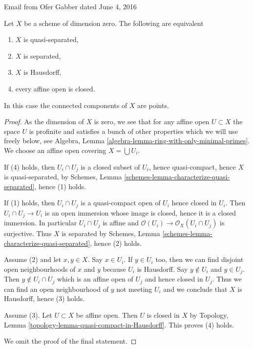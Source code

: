 \begin{lemma}
\label{lemma-dimension-zero}
\begin{reference}
Email from Ofer Gabber dated June 4, 2016
\end{reference}
Let $X$ be a scheme of dimension zero. The following are equivalent
\begin{enumerate}
\item $X$ is quasi-separated,
\item $X$ is separated,
\item $X$ is Hausdorff,
\item every affine open is closed.
\end{enumerate}
In this case the connected components of $X$ are points.
\end{lemma}

\begin{proof}
As the dimension of $X$ is zero, we see that for any affine open
$U \subset X$ the space $U$ is profinite and satisfies
a bunch of other properties which we will use freely below, see
Algebra, Lemma \ref{algebra-lemma-ring-with-only-minimal-primes}.
We choose an affine open covering $X = \bigcup U_i$.

\medskip\noindent
If (4) holds, then $U_i \cap U_j$ is a closed subset of
$U_i$, hence quasi-compact, hence $X$ is quasi-separated,
by Schemes, Lemma \ref{schemes-lemma-characterize-quasi-separated},
hence (1) holds.

\medskip\noindent
If (1) holds, then $U_i \cap U_j$ is a quasi-compact open
of $U_i$ hence closed in $U_i$. Then $U_i \cap U_j \to U_i$
is an open immersion whose image is closed, hence it is a
closed immersion. In particular $U_i \cap U_j$ is affine
and $\mathcal{O}(U_i) \to \mathcal{O}_X(U_i \cap U_j)$ is surjective.
Thus $X$ is separated
by Schemes, Lemma \ref{schemes-lemma-characterize-quasi-separated},
hence (2) holds.

\medskip\noindent
Assume (2) and let $x, y \in X$. Say $x \in U_i$. If $y \in U_i$
too, then we can find disjoint open neighbourhoods of $x$ and $y$
because $U_i$ is Hausdorff. Say $y \not \in U_i$ and $y \in U_j$.
Then $y \not \in U_i \cap U_j$ which is an affine open of $U_j$
and hence closed in $U_j$. Thus we can find an open neighbourhood
of $y$ not meeting $U_i$ and we conclude that $X$ is Hausdorff,
hence (3) holds.

\medskip\noindent
Assume (3). Let $U \subset X$ be affine open.
Then $U$ is closed in $X$ by Topology, Lemma
\ref{topology-lemma-quasi-compact-in-Hausdorff}.
This proves (4) holds.

\medskip\noindent
We omit the proof of the final statement.
\end{proof}







